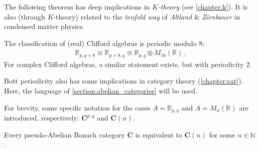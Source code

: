     The following theorem has deep implications in \textit{$K$-theory} (see  \cref{chapter:k}). It is also (through $K$-theory) related to the \textit{tenfold way} of \textit{Altland} \& \textit{Zirnbauer} in condensed matter physics.
    \begin{theorem}\label{clifford:bott_periodicity}
        The classification of (real) Clifford algebras is periodic modulo 8:
        \begin{gather}
            \mathbb{R}_{p,q+8}\cong\mathbb{R}_{p+8,q}\cong\mathbb{R}_{p,q}\otimes M_{16}(\mathbb{R})\,.
        \end{gather}
        For complex Clifford algebras, a similar statement exists, but with periodicity 2.
    \end{theorem}

    Bott periodicity also has some implications in category theory (\cref{chapter:cat}). Here, the language of \cref{section:abelian_categories} will be used.
    \begin{notation}
        For brevity, some specific notation for the cases $A=\mathbb{R}_{p,q}$ and $A=M_n(\mathbb{R})$ are introduced, respectively: $\mathbf{C}^{p,q}$ and $\mathbf{C}(n)$.
    \end{notation}

    \begin{property}
        Every pseudo-Abelian Banach category $\mathbf{C}$ is equivalent to $\mathbf{C}(n)$ for some $n\in\mathbb{N}$.
    \end{property}

